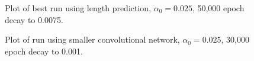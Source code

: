 \documentclass[12pt]{article}
\begin{document}
\begin{figure}[!htb]
\centering
{}\hfill
{}\hfill
\caption{Plot of best run using length prediction, $\alpha_0 = 0.025$, 50,000 epoch decay to 0.0075.}
\label{fig:length_best_results}
\end{figure}

\begin{figure}[!htb]
\centering
{}\hfill
{}\hfill
\caption{Plot of run using smaller convolutional network, $\alpha_0 = 0.025$, 30,000 epoch decay to 0.001.}
\label{fig:small_network_results}
\end{figure}
\end{document}
